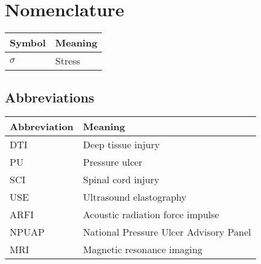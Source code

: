 \chapter*{Nomenclature}
	\begin{longtable}[l]{ll}
		Symbol & Meaning \\
		\hline \endhead
		$\sigma$ & Stress \\
	\end{longtable}

	\section*{Abbreviations}
		\begin{longtable}[l]{ll}
			Abbreviation & Meaning \\
			\hline \endhead
			DTI & Deep tissue injury \\
			PU & Pressure ulcer \\
			SCI & Spinal cord injury \\
			USE & Ultrasound elastography \\
			ARFI & Acoustic radiation force impulse \\
			NPUAP & National Pressure Ulcer Advisory Panel \\
			MRI & Magnetic resonance imaging
		\end{longtable}